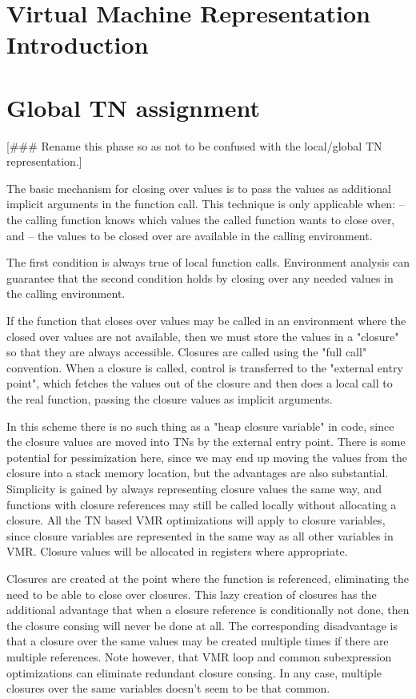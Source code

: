 

\chapter{Virtual Machine Representation Introduction}


\chapter{Global TN assignment}

[\#\#\# Rename this phase so as not to be confused with the local/global TN
representation.]

The basic mechanism for closing over values is to pass the values as additional
implicit arguments in the function call.  This technique is only applicable
when:
 -- the calling function knows which values the called function wants to close
    over, and
 -- the values to be closed over are available in the calling environment.

The first condition is always true of local function calls.  Environment
analysis can guarantee that the second condition holds by closing over any
needed values in the calling environment.

If the function that closes over values may be called in an environment where
the closed over values are not available, then we must store the values in a
"closure" so that they are always accessible.  Closures are called using the
"full call" convention.  When a closure is called, control is transferred to
the "external entry point", which fetches the values out of the closure and
then does a local call to the real function, passing the closure values as
implicit arguments.

In this scheme there is no such thing as a "heap closure variable" in code,
since the closure values are moved into TNs by the external entry point.  There
is some potential for pessimization here, since we may end up moving the values
from the closure into a stack memory location, but the advantages are also
substantial.  Simplicity is gained by always representing closure values the
same way, and functions with closure references may still be called locally
without allocating a closure.  All the TN based VMR optimizations will apply
to closure variables, since closure variables are represented in the same way
as all other variables in VMR.  Closure values will be allocated in registers
where appropriate.

Closures are created at the point where the function is referenced, eliminating
the need to be able to close over closures.  This lazy creation of closures has
the additional advantage that when a closure reference is conditionally not
done, then the closure consing will never be done at all.  The corresponding
disadvantage is that a closure over the same values may be created multiple
times if there are multiple references.  Note however, that VMR loop and common
subexpression optimizations can eliminate redundant closure consing.  In any
case, multiple closures over the same variables doesn't seem to be that common.

